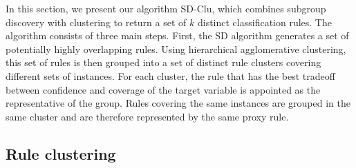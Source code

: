 \documentclass[
  oneside]{book}
\begin{document}
In this section, we present our algorithm SD-Clu, which combines subgroup discovery with clustering to return a set of \(k\) distinct classification rules.
The algorithm consists of three main steps.
First, the SD algorithm generates a set of potentially highly overlapping rules.
Using hierarchical agglomerative clustering, this set of rules is then grouped into a set of distinct rule clusters covering different sets of instances.
For each cluster, the rule that has the best tradeoff between confidence and coverage of the target variable is appointed as the representative of the group.
Rules covering the same instances are grouped in the same cluster and are therefore represented by the same proxy rule.

\hypertarget{rule-clustering}{%
\subsection{Rule clustering}\label{rule-clustering}}
\end{document}
